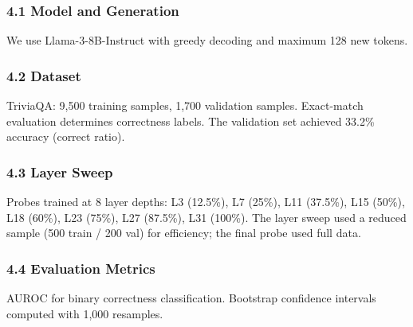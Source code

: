 
\subsubsection{4.1 Model and Generation}

We use Llama-3-8B-Instruct with greedy decoding and maximum 128 new tokens.

\subsubsection{4.2 Dataset}

TriviaQA: 9,500 training samples, 1,700 validation samples. Exact-match evaluation determines correctness labels. The validation set achieved 33.2\% accuracy (correct ratio).

\subsubsection{4.3 Layer Sweep}

Probes trained at 8 layer depths: L3 (12.5\%), L7 (25\%), L11 (37.5\%), L15 (50\%), L18 (60\%), L23 (75\%), L27 (87.5\%), L31 (100\%). The layer sweep used a reduced sample (500 train / 200 val) for efficiency; the final probe used full data.

\subsubsection{4.4 Evaluation Metrics}

AUROC for binary correctness classification. Bootstrap confidence intervals computed with 1,000 resamples.

